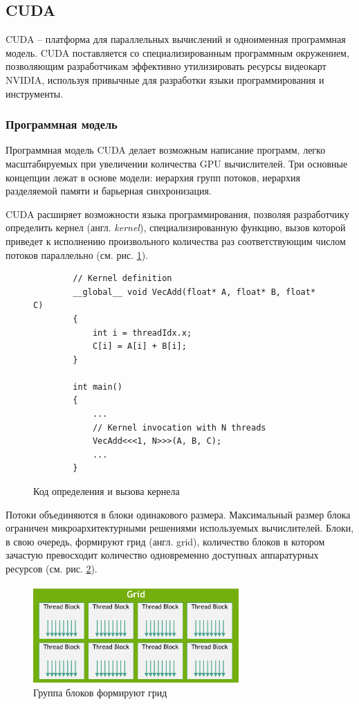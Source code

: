 \subsection{CUDA}

CUDA -- платформа для параллельных вычислений и одноименная программная модель\cite{CUDA_C_Programming_Guide}. CUDA поставляется со специализированным программным окружением, позволяющим разработчикам эффективно утилизировать ресурсы видеокарт NVIDIA, используя привычные для разработки языки программирования и инструменты.

\subsubsection{Программная модель}

Программная модель CUDA делает возможным написание программ, легко масштабируемых при увеличении количества GPU вычислителей. Три основные концепции лежат в основе модели: иерархия групп потоков, иерархия разделяемой памяти и барьерная синхронизация. 

CUDA расширяет возможности языка программирования, позволяя разработчику определить кернел (англ. \textit{kernel}), специализированную функцию, вызов которой приведет к исполнению произвольного количества раз соответствующим числом потоков параллельно (см. рис. \ref{code:Kernel}).

\begin{figure}[!ht]
    \centering
    \begin{verbatim}
        // Kernel definition
        __global__ void VecAdd(float* A, float* B, float* C)
        {
            int i = threadIdx.x;
            C[i] = A[i] + B[i];
        }

        int main()
        {
            ...
            // Kernel invocation with N threads
            VecAdd<<<1, N>>>(A, B, C);
            ...
        }
    \end{verbatim}
    \caption{Код определения и вызова кернела}\label{code:Kernel}
\end{figure}

Потоки объединяются в блоки одинакового размера. Максимальный размер блока ограничен микроархитектурными решениями используемых вычислителей. Блоки, в свою очередь, формируют грид (англ. grid), количество блоков в котором зачастую превосходит количество одновременно доступных аппаратурных ресурсов (см. рис. \ref{img:GridOfThreadBlocks}).

\begin{figure}[!ht]
    \centering
    \includegraphics[width=0.7\textwidth]{src/images/grid-of-thread-blocks}
    \caption{Группа блоков формируют грид}\label{img:GridOfThreadBlocks}
\end{figure}


